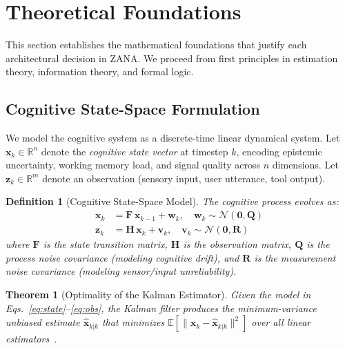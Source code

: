 \documentclass[12pt,a4paper]{article}
\newtheorem{theorem}{Theorem}[section]
\newtheorem{definition}{Definition}[section]
\begin{document}
\section{Theoretical Foundations}
\label{sec:theory}

This section establishes the mathematical foundations that justify each architectural decision
in ZANA. We proceed from first principles in estimation theory, information theory, and
formal logic.

\subsection{Cognitive State-Space Formulation}

We model the cognitive system as a discrete-time linear dynamical system. Let
$\mathbf{x}_k \in \mathbb{R}^n$ denote the \emph{cognitive state vector} at timestep $k$,
encoding epistemic uncertainty, working memory load, and signal quality across $n$ dimensions.
Let $\mathbf{z}_k \in \mathbb{R}^m$ denote an observation (sensory input, user utterance,
tool output).

\begin{definition}[Cognitive State-Space Model]
The cognitive process evolves as:
\begin{align}
  \mathbf{x}_k &= \mathbf{F}\,\mathbf{x}_{k-1} + \mathbf{w}_k,
    \quad \mathbf{w}_k \sim \mathcal{N}(\mathbf{0}, \mathbf{Q}) \label{eq:state}\\
  \mathbf{z}_k &= \mathbf{H}\,\mathbf{x}_k + \mathbf{v}_k,
    \quad \mathbf{v}_k \sim \mathcal{N}(\mathbf{0}, \mathbf{R}) \label{eq:obs}
\end{align}
where $\mathbf{F}$ is the state transition matrix, $\mathbf{H}$ is the observation matrix,
$\mathbf{Q}$ is the process noise covariance (modeling cognitive drift), and $\mathbf{R}$ is
the measurement noise covariance (modeling sensor/input unreliability).
\end{definition}

\begin{theorem}[Optimality of the Kalman Estimator]
Given the model in Eqs.~\eqref{eq:state}--\eqref{eq:obs}, the Kalman filter produces the
minimum-variance unbiased estimate $\hat{\mathbf{x}}_{k|k}$ that minimizes
$\mathbb{E}[\|\mathbf{x}_k - \hat{\mathbf{x}}_{k|k}\|^2]$
over all linear estimators~\cite{kalman1960filter}.
\end{theorem}
\end{document}
